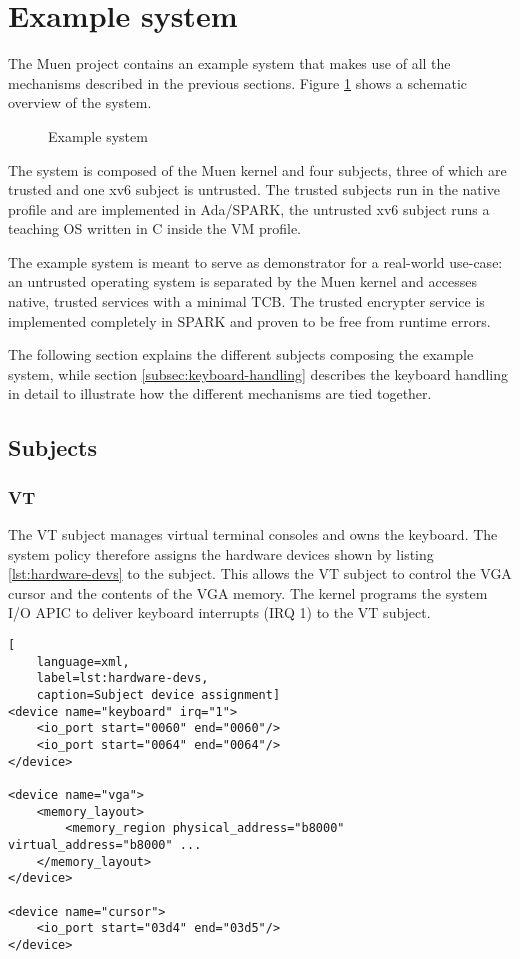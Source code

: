 \section{Example system}\label{sec:example-system}
The Muen project contains an example system that makes use of all the
mechanisms described in the previous sections. Figure \ref{fig:example-system}
shows a schematic overview of the system.

\begin{figure}[h]
	\centering
	
	\caption{Example system}
	\label{fig:example-system}
\end{figure}

The system is composed of the Muen kernel and four subjects, three of which are
trusted and one xv6 subject is untrusted. The trusted subjects run in the native
profile and are implemented in Ada/SPARK, the untrusted xv6 subject runs a
teaching OS written in C inside the VM profile.

The example system is meant to serve as demonstrator for a real-world use-case:
an untrusted operating system is separated by the Muen kernel and accesses
native, trusted services with a minimal TCB. The trusted encrypter service is
implemented completely in SPARK and proven to be free from runtime errors.

The following section explains the different subjects composing the example
system, while section \ref{subsec:keyboard-handling} describes the keyboard
handling in detail to illustrate how the different mechanisms are tied
together.

\subsection{Subjects}

\subsubsection{VT}\label{subsubsec:subject-vt}
The VT subject manages virtual terminal consoles and owns the keyboard. The
system policy therefore assigns the hardware devices shown by listing
\ref{lst:hardware-devs} to the subject. This allows the VT subject to control
the VGA cursor and the contents of the VGA memory. The kernel programs the
system I/O APIC to deliver keyboard interrupts (IRQ 1) to the VT subject.

\begin{lstlisting}[
	language=xml,
	label=lst:hardware-devs,
	caption=Subject device assignment]
<device name="keyboard" irq="1">
    <io_port start="0060" end="0060"/>
    <io_port start="0064" end="0064"/>
</device>

<device name="vga">
    <memory_layout>
        <memory_region physical_address="b8000" virtual_address="b8000" ...
    </memory_layout>
</device>

<device name="cursor">
    <io_port start="03d4" end="03d5"/>
</device>
\end{lstlisting}

